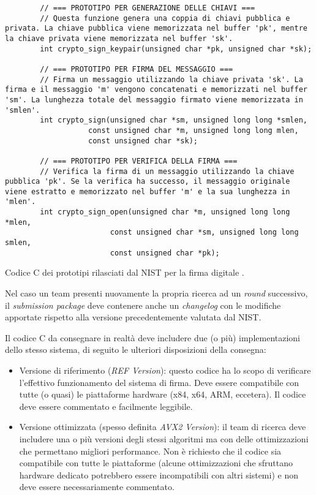 \begin{listing}[H]
    \begin{verbatim}
        // === PROTOTIPO PER GENERAZIONE DELLE CHIAVI ===
        // Questa funzione genera una coppia di chiavi pubblica e privata. La chiave pubblica viene memorizzata nel buffer 'pk', mentre la chiave privata viene memorizzata nel buffer 'sk'.
        int crypto_sign_keypair(unsigned char *pk, unsigned char *sk);
    
        // === PROTOTIPO PER FIRMA DEL MESSAGGIO ===
        // Firma un messaggio utilizzando la chiave privata 'sk'. La firma e il messaggio 'm' vengono concatenati e memorizzati nel buffer 'sm'. La lunghezza totale del messaggio firmato viene memorizzata in 'smlen'.
        int crypto_sign(unsigned char *sm, unsigned long long *smlen,
                   const unsigned char *m, unsigned long long mlen,
                   const unsigned char *sk);
    
        // === PROTOTIPO PER VERIFICA DELLA FIRMA ===
        // Verifica la firma di un messaggio utilizzando la chiave pubblica 'pk'. Se la verifica ha successo, il messaggio originale viene estratto e memorizzato nel buffer 'm' e la sua lunghezza in 'mlen'.
        int crypto_sign_open(unsigned char *m, unsigned long long *mlen,
                        const unsigned char *sm, unsigned long long smlen,
                        const unsigned char *pk);
    \end{verbatim}
    \caption{Codice C dei prototipi rilasciati dal NIST per la firma digitale \cite{nist-pqc-api}.}
    \label{code:crypto_sign_prototypes}
\end{listing}

Nel caso un team presenti nuovamente la propria ricerca ad un \textit{round} successivo, il \textit{submission package} deve contenere anche un \textit{changelog} con le modifiche apportate rispetto alla versione precedentemente valutata dal NIST.

Il codice C da consegnare in realtà deve includere due (o più) implementazioni dello stesso sistema, di seguito le ulteriori disposizioni della consegna:
\begin{itemize}
    \item Versione di riferimento (\textit{REF Version}): questo codice ha lo scopo di verificare l'effettivo funzionamento del sistema di firma. Deve essere compatibile con tutte (o quasi) le piattaforme hardware (x84, x64, ARM, eccetera). Il codice deve essere commentato e facilmente leggibile.
    \item Versione ottimizzata (spesso definita \textit{AVX2 Version}): il team di ricerca deve includere una o più versioni degli stessi algoritmi ma con delle ottimizzazioni che permettano migliori performance. Non è richiesto che il codice sia compatibile con tutte le piattaforme (alcune ottimizzazioni che sfruttano hardware dedicato potrebbero essere incompatibili con altri sistemi) e non deve essere necessariamente commentato.
\end{itemize}

